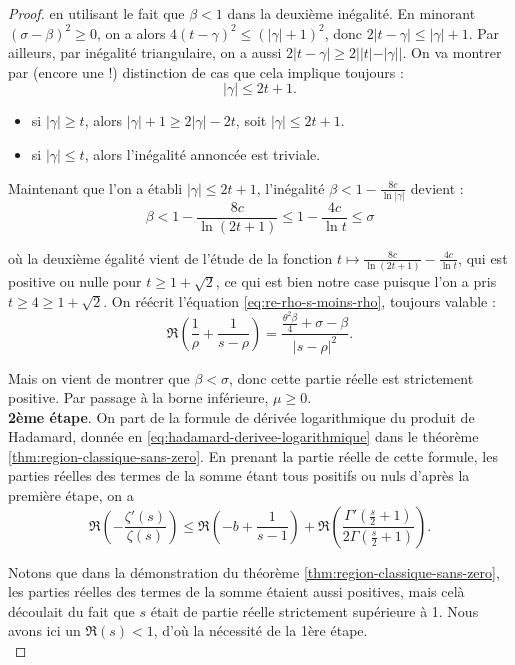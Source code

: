 \documentclass[french]{report}
\begin{document}
\begin{proof}
  en utilisant le fait que $\beta<1$ dans la deuxième inégalité. En minorant $(\sigma-\beta)^2\geq 0$, on a alors $4(t-\gamma)^2\leq (|\gamma|+1)^2$, donc $2|t-\gamma| \leq |\gamma| + 1$. Par ailleurs, par inégalité triangulaire, on a aussi $2|t-\gamma| \geq 2||t| - |\gamma||$. On va montrer par (encore une !) distinction de cas que cela implique toujours :
  \[
    |\gamma|\leq 2t+1.
  \]

  \begin{itemize}
    \item si $|\gamma|\geq t$, alors $|\gamma|+1\geq 2|\gamma|-2t$, soit $|\gamma|\leq 2t+1$.
    \item si $|\gamma|\leq t$, alors l'inégalité annoncée est triviale.
  \end{itemize}

  Maintenant que l'on a établi $|\gamma|\leq 2t+1$, l'inégalité $\beta< 1-\frac{8c}{\ln|\gamma|}$ devient :
  \[
    \beta
    < 1-\frac{8c}{\ln(2t+1)}
    \leq 1-\frac{4c}{\ln t}
    \leq \sigma
  \]

  où la deuxième égalité vient de l'étude de la fonction $t\mapsto\frac{8c}{\ln(2t+1)}-\frac{4c}{\ln t}$, qui est positive ou nulle pour $t\geq 1+\sqrt{2}$, ce qui est bien notre case puisque l'on a pris $t\geq 4\geq 1+\sqrt{2}$. On réécrit l'équation \ref{eq:re-rho-s-moins-rho}, toujours valable :
  \[
    \Re\left(\frac{1}{\rho}+\frac{1}{s-\rho}\right)
    = \frac{\frac{\theta^2 \beta}{4} + \sigma - \beta}{|s-\rho|^2}.
  \]

  Mais on vient de montrer que $\beta<\sigma$, donc cette partie réelle est strictement positive. Par passage à la borne inférieure, $\mu\geq 0$.
  \\

  \textbf{2ème étape}. On part de la formule de dérivée logarithmique du produit de Hadamard, donnée en \ref{eq:hadamard-derivee-logarithmique} dans le théorème \ref{thm:region-classique-sans-zero}. En prenant la partie réelle de cette formule, les parties réelles des termes de la somme étant tous positifs ou nuls d'après la première étape, on a
  \[
    \Re\left(-\frac{\zeta'(s)}{\zeta(s)}\right)
    \leq \Re\left(-b + \frac{1}{s-1}\right)
    + \Re\left(\frac{\Gamma'(\frac{s}{2}+1)}{2\Gamma(\frac{s}{2}+1)}\right).
  \]

  Notons que dans la démonstration du théorème \ref{thm:region-classique-sans-zero}, les parties réelles des termes de la somme étaient aussi positives, mais celà découlait du fait que $s$ était de partie réelle strictement supérieure à 1. Nous avons ici un $\Re(s)<1$, d'où la nécessité de la 1ère étape.
  \\


\end{proof}
\end{document}
